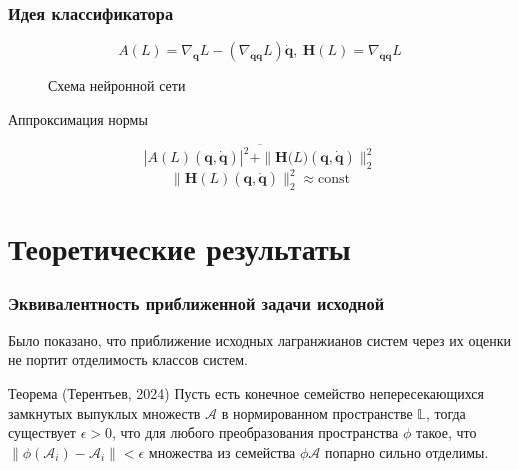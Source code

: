 \documentclass{beamer}
\begin{document}
\begin{frame}
\frametitle{Идея классификатора}
$$A(L) = \nabla_{\mathbf{q}} L-\left(\nabla_{\dot{\mathbf{q}}\mathbf{q}} L\right) \dot{\mathbf{q}},\ \mathbf{H}(L) = \nabla_{\dot{\mathbf{q}} \dot{\mathbf{q}}} L$$

\begin{figure}
\centering
{}
\caption{Схема нейронной сети}
\label{fig: LNN}
\end{figure}
\begin{block}{Аппроксимация нормы}

$$\overline{|A(L)\left(\mathbf{q}, \dot{\mathbf{q}}\right)|^2 + \|\mathbf{H(}L)\left(\mathbf{q}, \dot{\mathbf{q}}\right)\|_2^2}$$
$$\|\mathbf{H}(L)\left(\mathbf{q}, \dot{\mathbf{q}}\right)\|_2^2 \approx \text{const}$$
\end{block}

\end{frame}

\section{Теоретические результаты}

\begin{frame}
\frametitle{Эквивалентность приближенной задачи исходной}
Было показано, что приближение исходных лагранжианов систем через их оценки не портит отделимость классов систем.
\begin{block} {Теорема (Терентьев, 2024)}
Пусть есть конечное семейство непересекающихся замкнутых выпуклых множеств $\mathcal{A}$ в нормированном пространстве $\mathbb{L}$, тогда существует $\epsilon > 0$, что для любого преобразования пространства $\phi$ такое, что $\|\phi(\mathcal{A}_{i}) - \mathcal{A}_{i}\| < \epsilon$ множества из семейства $\phi{\mathcal{A}}$ попарно сильно отделимы.
\end{block} 
\end{frame}
\end{document}
